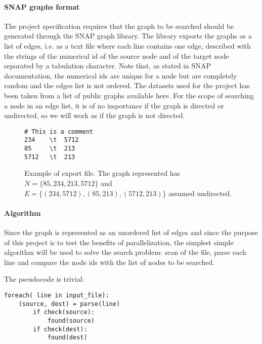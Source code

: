 \documentclass[11pt]{article}
\begin{document}
\paragraph{SNAP graphs format} The project specification requires that the graph to be searched should be generated through the SNAP graph library. %
The library exports the graphs as a list of edges, i.e. as a text file where each line contains one edge,
described with the strings of the numerical id of the source node and of the target node separated by a tabulation character.
Note that, as stated in SNAP documentation, the numerical ids are unique for a node but are completely random and the edges list is not ordered.
The datasets used for the project has been taken from a list of public graphs available here. %
For the scope of searching a node in an edge list, it is of no importance if the graph is directed or undirected, so we will work as if the graph is not directed.

\begin{figure}
\begin{center}
\begin{verbatim}
# This is a comment
234    \t  5712
85     \t  213
5712   \t  213
\end{verbatim}
\end{center}
\begin{caption}
Example of export file. The graph represented has $N=\{85, 234, 213, 5712\}$ and $E = \{(234, 5712), (85,213), (5712,213)\}$ assumed undirected.
\end{caption}

\end{figure}

\paragraph{Algorithm} Since the graph is represented as an unordered list of edges and since the purpose of this project is to test the benefits of parallelization,  the simplest simple algorithm will be used to solve the search problem: scan of the file, parse each line and compare the node ids with the list of nodes to be searched.

The pseudocode is trivial:
\begin{verbatim}
foreach( line in input_file):
    (source, dest) = parse(line)
        if check(source):
            found(source)
        if check(dest):
            found(dest)
\end{verbatim}
\end{document}
